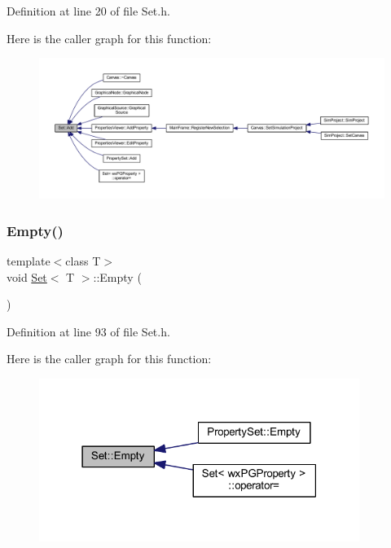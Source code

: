 Definition at line 20 of file Set.\+h.

Here is the caller graph for this function\+:
\nopagebreak
\begin{figure}[H]
\begin{center}
\leavevmode
\includegraphics[width=350pt]{class_set_afc630403d8cd371e244ff4c425b40edf_icgraph}
\end{center}
\end{figure}
\mbox{\label{class_set_a747da8b4e20a30c1fe7e5e1fd61881aa}} 
\subsubsection{\texorpdfstring{Empty()}{Empty()}}
{\footnotesize\ttfamily template$<$class T$>$ \\
void \hyperlink{class_set}{Set}$<$ T $>$\+::Empty (\begin{DoxyParamCaption}{ }\end{DoxyParamCaption})\hspace{0.3cm}{\ttfamily [inline]}}



Definition at line 93 of file Set.\+h.

Here is the caller graph for this function\+:
\nopagebreak
\begin{figure}[H]
\begin{center}
\leavevmode
\includegraphics[width=295pt]{class_set_a747da8b4e20a30c1fe7e5e1fd61881aa_icgraph}
\end{center}
\end{figure}
\mbox{\label{class_set_a6afa992f88acf67a53ae98e7856a9266}} 
